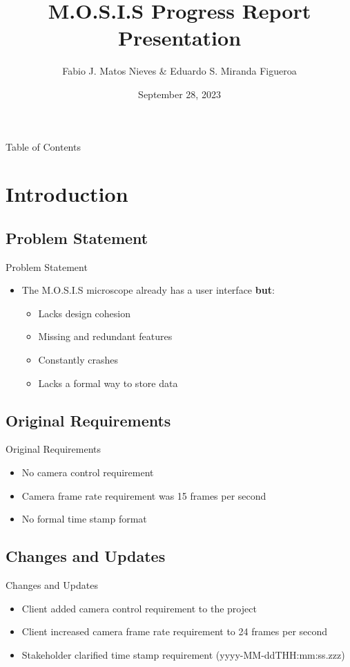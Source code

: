 \documentclass[17pt, aspectratio=169]{beamer}
\title{M.O.S.I.S Progress Report Presentation}
\author[Fabio J. \& Eduardo S.]{Fabio J. Matos Nieves \& Eduardo S. Miranda Figueroa}
\institute[UPRM]{University of Puerto Rico Mayagüez Campus}
\date{September 28, 2023}
\begin{document}
\begin{frame}
	\maketitle
\end{frame}
\begin{frame}{Table of Contents}
	\begin{multicols}{2}
		\begin{spacing}{0.8}
			\tableofcontents
		\end{spacing}
	\end{multicols}
\end{frame}
\section{Introduction}
\subsection{Problem Statement}
\begin{frame}{Problem Statement}
	\begin{itemize}
		\item The M.O.S.I.S microscope already has a user interface \textbf{but}:
		      \begin{itemize}
			      \item Lacks design cohesion
			      \item Missing and redundant features
			      \item Constantly crashes
			      \item Lacks a formal way to store data
		      \end{itemize}
	\end{itemize}
\end{frame}
\subsection*{Original Requirements}
\begin{frame}{Original Requirements}
	\begin{itemize}
		\item No camera control requirement
		\item Camera frame rate requirement was 15 frames per second
		\item No formal time stamp format 
	\end{itemize}
\end{frame}
\subsection*{Changes and Updates}
\begin{frame}{Changes and Updates}
	\begin{itemize}
		\item Client added camera control requirement to the project
		\item Client increased camera frame rate requirement to 24 frames per second
		\item Stakeholder clarified time stamp requirement (yyyy-MM-ddTHH:mm:ss.zzz)
	\end{itemize}
\end{frame}
\end{document}
